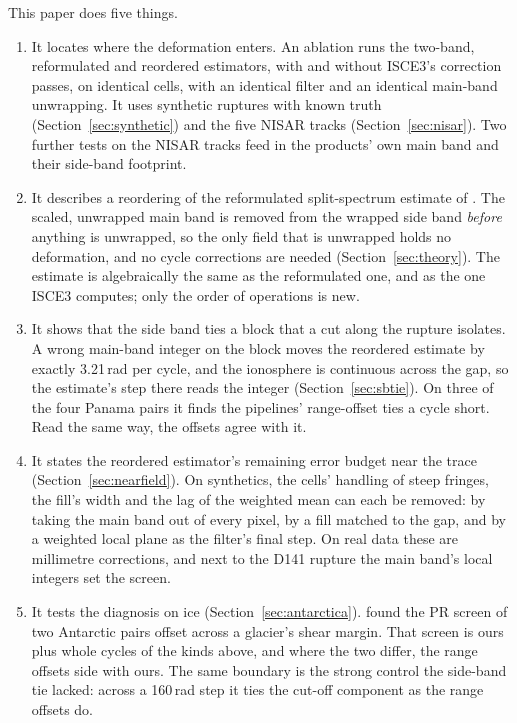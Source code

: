 This paper does five things.
\begin{enumerate}
  \item It locates where the deformation enters. An ablation runs the two-band, reformulated and reordered
        estimators, with and without ISCE3's correction passes, on identical cells, with an identical filter and
        an identical main-band unwrapping. It uses synthetic ruptures with known truth
        (Section~\ref{sec:synthetic}) and the five NISAR tracks (Section~\ref{sec:nisar}). Two further tests on the
        NISAR tracks feed in the products' own main band and their side-band footprint.
  \item It describes a reordering of the reformulated split-spectrum estimate of \citet{wegmuller2018reformulating}.
        The scaled, unwrapped main band is removed from the wrapped side band \emph{before} anything is unwrapped,
        so the only field that is unwrapped holds no deformation, and no cycle corrections are needed
        (Section~\ref{sec:theory}). The estimate is algebraically the same as the reformulated one, and as the one
        ISCE3 computes; only the order of operations is new.
  \item It shows that the side band ties a block that a cut along the rupture isolates. A wrong main-band integer
        on the block moves the reordered estimate by exactly 3.21\,rad per cycle, and the ionosphere is continuous
        across the gap, so the estimate's step there reads the integer (Section~\ref{sec:sbtie}). On three of the four
        Panama pairs it finds the pipelines' range-offset ties a cycle short. Read the same way, the offsets agree with it.
  \item It states the reordered estimator's remaining error budget near the trace (Section~\ref{sec:nearfield}). On
        synthetics, the cells' handling of steep fringes, the fill's width and the lag of the weighted mean can each
        be removed: by taking the main band out of every pixel, by a fill matched to the gap, and by a weighted local
        plane as the filter's final step. On real data these are millimetre corrections, and next to the D141 rupture
        the main band's local integers set the screen.
  \item It tests the diagnosis on ice (Section~\ref{sec:antarctica}). \citet{joughin2026nisarerrors} found the PR screen
        of two Antarctic pairs offset across a glacier's shear margin. That screen is ours plus whole cycles of the kinds
        above, and where the two differ, the range offsets side with ours. The same boundary is the strong control the
        side-band tie lacked: across a 160\,rad step it ties the cut-off component as the range offsets do.
\end{enumerate}
